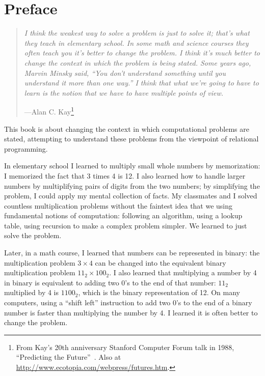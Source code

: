\chapter{Preface}\label{sec:preface}

\vspace{-1cm}

\begin{quotation}
\noindent
\emph{I think the weakest way to solve a problem is just to solve it; that's what they teach in elementary school. In some math and science courses they often teach you it's better to change the problem. I think it's much better to change the context in which the problem is being stated. Some years ago, Marvin Minsky said, ``You don't understand something until you understand it more than one way.'' I think that what we're going to have to learn is the notion that we have to have multiple points of view.}
\begin{flushright}
\vspace{-0.3em}
---Alan C. Kay\footnote{From Kay's 20th anniversary Stanford Computer Forum talk in 1988, ``Predicting the Future''~\cite{Kay:1989}. Also at \url{http://www.ecotopia.com/webpress/futures.htm}.}
\end{flushright}
\end{quotation}


This book is about changing the context in which computational
problems are stated, attempting to understand these problems from the
viewpoint of relational programming.


%

In elementary school I learned to multiply small whole numbers by
memorization: I memorized the fact that 3 times 4 is 12.
%
I also learned how to handle larger numbers by multiplifying pairs of
digits from the two numbers; by simplifying the problem, I could apply
my mental collection of facts.
%
My classmates and I solved countless multiplication problems without
the faintest idea that we using fundamental notions of computation:
following an algorithm, using a lookup table, using recursion to make
a complex problem simpler.
%
We learned to just solve the problem.

Later, in a math course, I learned that numbers can be represented in
binary: the multiplication problem $3 \times 4$ can be changed into
the equivalent binary multiplication problem $11_2 \times 100_2$.
%
I also learned that multiplying a number by 4 in binary is equivalent
to adding two 0's to the end of that number: $11_2$ multiplied by 4 is
$1100_2$, which is the binary representation of 12.
%
On many computers, using a ``shift left'' instruction to add two 0's to
the end of a binary number is faster than multiplying the number by 4.
%
I learned it is often better to change the problem.

